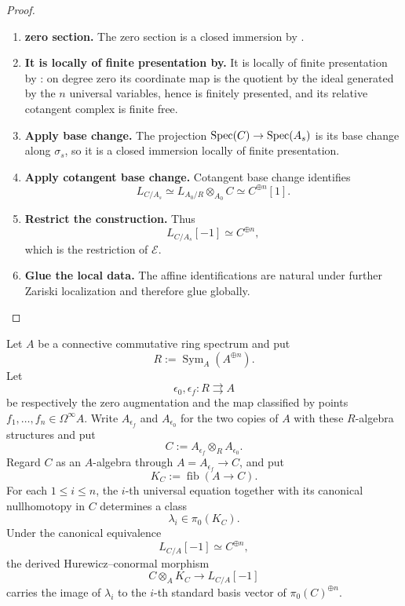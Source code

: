 \begin{proof}
\begin{enumerate}[label=\textup{(\arabic*)}]
    \item \textbf{zero section.}
    The zero section is a closed immersion by .

    \item \textbf{It is locally of finite presentation by.}
    It is locally of finite presentation by : on degree
    zero its coordinate map is the quotient by the ideal generated by the \(n\) universal
    variables, hence is finitely presented, and its relative cotangent complex is finite free.

    \item \textbf{Apply base change.}
    The projection \(\operatorname{Spec}(C)\to\operatorname{Spec}(A_s)\) is its base change along \(\sigma_s\), so it is a closed immersion
    locally of finite presentation.

    \item \textbf{Apply cotangent base change.}
    Cotangent base change identifies
    \[
        L_{C/A_s}
        \simeq
        L_{A_0/R}\otimes_{A_0}C
        \simeq
        C^{\oplus n}[1].
    \]

    \item \textbf{Restrict the construction.}
    Thus
    \[
        L_{C/A_s}[-1]\simeq C^{\oplus n},
    \]
    which is the restriction of \(\mathcal E\).

    \item \textbf{Glue the local data.}
    The affine identifications are natural under further Zariski localization and therefore glue
    globally.
\end{enumerate}
\end{proof}

\begin{lemma}
\label{lem:universal-equations-conormal-basis}
Let \(A\) be a connective commutative ring spectrum and put
\[
    R:=\operatorname{Sym}_A(A^{\oplus n}).
\]
Let
\[
    \epsilon_0,\epsilon_f:R\rightrightarrows A
\]
be respectively the zero augmentation and the map classified by points
\(f_1,\ldots,f_n\in\Omega^\infty A\). Write
\(A_{\epsilon_f}\) and \(A_{\epsilon_0}\) for the two copies of \(A\) with
these \(R\)-algebra structures and put
\[
    C:=A_{\epsilon_f}\otimes_R A_{\epsilon_0}.
\]
Regard \(C\) as an \(A\)-algebra through
\(A=A_{\epsilon_f}\to C\), and put
\[
    K_C:=\operatorname{fib}(A\to C).
\]
For each \(1\leq i\leq n\), the \(i\)-th universal equation together with
its canonical nullhomotopy in \(C\) determines a class
\[
    \lambda_i\in\pi_0(K_C).
\]
Under the canonical equivalence
\[
    L_{C/A}[-1]\simeq C^{\oplus n},
\]
the derived Hurewicz--conormal morphism
\[
    C\otimes_AK_C\longrightarrow L_{C/A}[-1]
\]
carries the image of \(\lambda_i\) to the \(i\)-th standard basis vector of
\(\pi_0(C)^{\oplus n}\).
\end{lemma}

